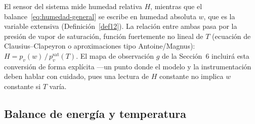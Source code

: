 \begin{remark}
\label{rem:hr-ha}
El sensor del sistema mide humedad relativa $H$, mientras que el balance~\eqref{eq:humedad-general} se escribe en humedad absoluta $w$, que es la variable extensiva (Definici\'on~\ref{def12}). La relaci\'on entre ambas pasa por la presi\'on de vapor de saturaci\'on, funci\'on fuertemente no lineal de $T$ (ecuaci\'on de Clausius--Clapeyron o aproximaciones tipo Antoine/Magnus): $H = p_v(w)\,/\,p_v^{\mathrm{sat}}(T)$. El mapa de observaci\'on $g$ de la Secci\'on~6 incluir\'a esta conversi\'on de forma expl\'icita ---un punto donde el modelo y la instrumentaci\'on deben hablar con cuidado, pues una lectura de $H$ constante no implica $w$ constante si $T$ var\'ia.
\end{remark}

\subsection{Balance de energ\'ia y temperatura}
\label{sec:energia}

